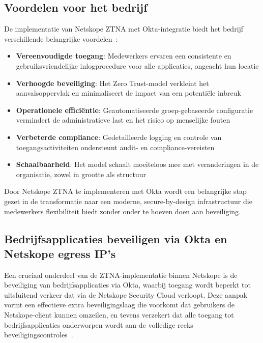 \subsection{Voordelen voor het bedrijf}
De implementatie van Netskope ZTNA met Okta-integratie biedt het bedrijf verschillende belangrijke voordelen~\autocite{Okta2025}:

\begin{itemize}
    \item \textbf{Vereenvoudigde toegang}: Medewerkers ervaren een consistente en gebruiksvriendelijke inlogprocedure voor alle applicaties, ongeacht hun locatie
    \item \textbf{Verhoogde beveiliging}: Het Zero Trust-model verkleint het aanvalsoppervlak en minimaliseert de impact van een potentiële inbreuk
    \item \textbf{Operationele efficiëntie}: Geautomatiseerde groep-gebaseerde configuratie vermindert de administratieve last en het risico op menselijke fouten
    \item \textbf{Verbeterde compliance}: Gedetailleerde logging en controle van toegangsactiviteiten ondersteunt audit- en compliance-vereisten
    \item \textbf{Schaalbaarheid}: Het model schaalt moeiteloos mee met veranderingen in de organisatie, zowel in grootte als structuur
\end{itemize}

Door Netskope ZTNA te implementeren met Okta wordt een belangrijke stap gezet in de transformatie naar een moderne, secure-by-design infrastructuur die medewerkers flexibiliteit biedt zonder onder te hoeven doen aan beveiliging.

\subsection{Bedrijfsapplicaties beveiligen via Okta en Netskope egress IP's}

Een cruciaal onderdeel van de ZTNA-implementatie binnen Netskope is de beveiliging van bedrijfsapplicaties via Okta, waarbij toegang wordt beperkt tot uitsluitend verkeer dat via de Netskope Security Cloud verloopt. Deze aanpak vormt een effectieve extra beveiligingslaag die voorkomt dat gebruikers de Netskope-client kunnen omzeilen, en tevens verzekert dat alle toegang tot bedrijfsapplicaties onderworpen wordt aan de volledige reeks beveiligingscontroles~\autocite{Okta2025-2}.

\vspace{2ex}

